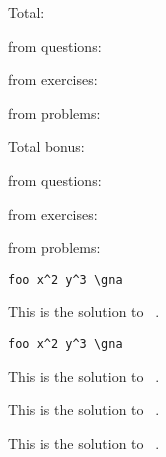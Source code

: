 \documentclass{article}
\newcommand*\writehere{%
      \IfInsideSolutionTF{}{%
        \tcblower
        \emph{Your answer:}
        \vspace*{4cm}
      }%
    }
\begin{document}
Total: \printtotalpoints \par
from questions:  \par
from exercises:  \par
from problems:  \par \bigskip

Total bonus: \printtotalbonus \par
from questions:  \par
from exercises:  \par
from problems:  \par

\begin{question}[points=4,bonus-points=1,topics=geometry,tags={geometry,triangles},grade=7]
  \lipsum[1]
\begin{verbatim}
foo x^2 y^3 \gna
\end{verbatim}
\end{question}
\begin{solution}[print]
  This is the solution to \ExerciseType\ .
\begin{verbatim}
foo x^2 y^3 \gna
\end{verbatim}
\end{solution}


\begin{question}[subtitle=Foo,points=5,topics=analysis,tags={analysis,functions},grade=11]
  \lipsum[2]
\end{question}
\begin{solution}
  This is the solution to \ExerciseType\ .
\end{solution}


\begin{problem}[tags={analysis,functions}]
  \lipsum[3]
  \writehere
\end{problem}
\begin{answer}
  This is the solution to \ExerciseType\ .
\end{answer}


\begin{exercise}
  \lipsum[4]
\end{exercise}
\begin{hint}
  This is the solution to \ExerciseType\ .
\end{hint}
\end{document}
